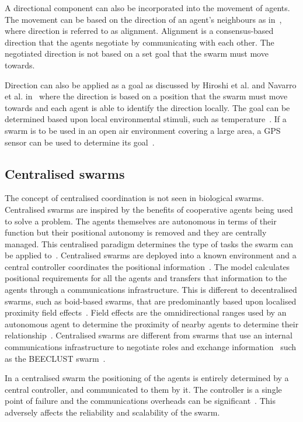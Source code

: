 A directional component can also be incorporated into the movement of agents. The movement can be based on the direction of an agent's neighbours as in~\cite{REY:87, JMM:08}, where direction is referred to as alignment. Alignment is a consensus-based direction that the agents negotiate by communicating with each other. The negotiated direction is not based on a set goal that the swarm must move towards. 

Direction can also be applied as a goal as discussed by Hiroshi et al. and Navarro et al. in~\cite{HAY:08, IGMFM:08} where the direction is based on a position that the swarm must move towards and each agent is able to identify the direction locally. The goal can be determined based upon local environmental stimuli, such as temperature~\cite{PG:08}. If a swarm is to be used in an open air environment covering a large area, a GPS sensor can be used to determine its goal~\cite{SH:11}. 

\subsection{Centralised swarms}
The concept of centralised coordination is not seen in biological swarms.
Centralised swarms are inspired by the benefits of cooperative agents being used to solve a problem. The agents themselves are autonomous in terms of their function but their positional autonomy is removed and they are centrally managed. This centralised paradigm determines the type of tasks the swarm can be applied to~\cite{AZMD:15, MGFND:05, LADPC:07}. Centralised swarms are deployed into a known environment and a central controller coordinates the positional information~\cite{I:01, NM:12, SB:93, MYP:09}. The model calculates positional requirements for all the agents and transfers that information to the agents through a communications infrastructure. This is different to decentralised swarms, such as boid-based swarms, that are predominantly based upon localised proximity field effects~\cite{BAF:06, BAFVM:06, BFV:07, BM:09}. Field effects are the omnidirectional ranges used by an autonomous agent to determine the proximity of nearby agents to determine their relationship~\cite{BAF:06}. Centralised swarms are different from swarms that use an internal communications infrastructure to negotiate roles and exchange information~\cite{OFM:07} such as the BEECLUST swarm~\cite{HER:11}. 

In a centralised swarm the positioning of the agents is entirely determined by a central controller, and communicated to them by it. The controller is a single point of failure and the communications overheads can be significant~\cite{NVC:15}. This adversely affects the reliability and scalability of the swarm.

